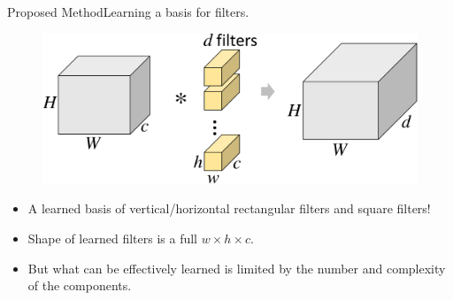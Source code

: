 \documentclass[t,xcolor=dvipsnames]{beamer}
\begin{document}
\begin{frame}{Proposed Method}{Learning a basis for filters.}
\begin{figure}
   \includegraphics[width=\textwidth, page=4]{../Figs/PDF/sparsification}
\end{figure}
\begin{itemize}
    \item A learned basis of vertical/horizontal rectangular filters and square filters!
    \item Shape of learned filters is a full $w \times h \times c$.
    \item But what can be effectively learned is limited by the number and complexity of the components.
\end{itemize}
\end{frame}
\end{document}
